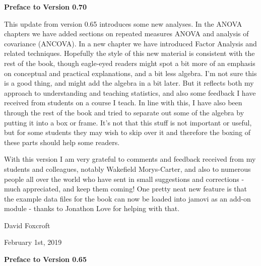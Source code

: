 

\newcommand{\vsp}{\vspace*{6pt}}

\begin{center}{\Large {\bf Preface to Version 0.70}}\end{center}
\vspace*{12pt}

\noindent
This update from version 0.65 introduces some new analyses. In the ANOVA chapters we have added sections on repeated measures ANOVA and analysis of covariance (ANCOVA). In a new chapter we have introduced Factor Analysis and related techniques. Hopefully the style of this new material is consistent with the rest of the book, though eagle-eyed readers might spot a bit more of an emphasis on conceptual and practical explanations, and a bit less algebra. I'm not sure this is a good thing, and might add the algebra in a bit later. But it reflects both my approach to understanding and teaching statistics, and also some feedback I have received from students on a course I teach. In line with this, I have also been through the rest of the book and tried to separate out some of the algebra by putting it into a box or frame. It's not that this stuff is not important or useful, but for some students they may wish to skip over it and therefore the boxing of these parts should help some readers. 

With this version I am very grateful to comments and feedback received from my students and colleagues, notably Wakefield Morys-Carter, and also to numerous people all over the world who have sent in small suggestions and corrections - much appreciated, and keep them coming! One pretty neat new feature is that the example data files for the book can now be loaded into jamovi as an add-on module - thanks to Jonathon Love for helping with that.

\vspace*{24pt}
\noindent
David Foxcroft 

\noindent
February 1st, 2019

\vspace*{30pt}


\begin{center}{\Large {\bf Preface to Version 0.65}}\end{center}
\vspace*{12pt}

